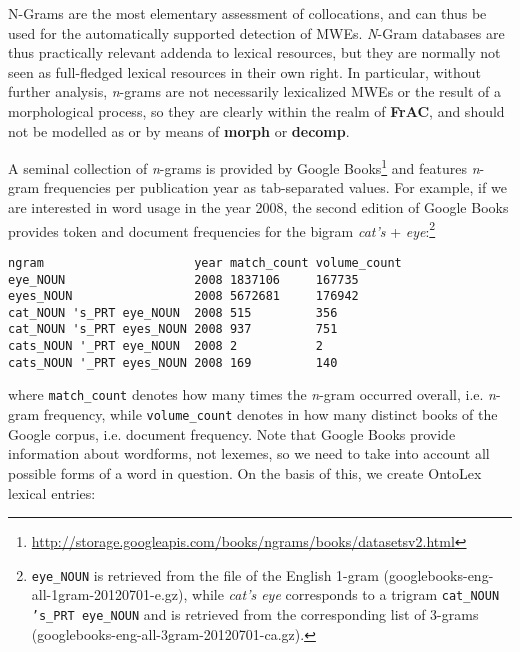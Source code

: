 \documentclass[output=paper,colorlinks,citecolor=brown]{langscibook}
\begin{document}


N-Grams are the most elementary assessment of collocations, and can thus be used for the automatically supported detection of MWEs. \textit{N}-Gram databases are thus practically relevant addenda to lexical resources, but they are normally not seen as full-fledged lexical resources in their own right. In particular, without further analysis, \textit{n}-grams  are not necessarily lexicalized MWEs or the result of a morphological process, so they are clearly within the realm of \textbf{FrAC}, and should not be modelled as  or by means of \textbf{morph} or \textbf{decomp}.

A seminal collection of \textit{n}-grams is provided by
Google Books\footnote{\url{http://storage.googleapis.com/books/ngrams/books/datasetsv2.html}} and features \textit{n}-gram frequencies per publication year as
tab-separated values. For example, if we are interested in word usage in the year 2008, the second edition of Google Books provides token and document frequencies for the bigram \emph{cat's} + \emph{eye}:\footnote{%
\texttt{eye\_NOUN} is retrieved from the file of the English 1-gram (googlebooks-eng-all-1gram-20120701-e.gz), while \textit{cat's eye} corresponds to a trigram \texttt{cat\_NOUN 's\_PRT eye\_NOUN} and is retrieved from the corresponding list of 3-grams (googlebooks-eng-all-3gram-20120701-ca.gz).
}


{\listingsize
\begin{verbatim}
ngram                     year match_count volume_count
eye_NOUN                  2008 1837106     167735
eyes_NOUN                 2008 5672681     176942
cat_NOUN 's_PRT eye_NOUN  2008 515         356
cat_NOUN 's_PRT eyes_NOUN 2008 937         751
cats_NOUN '_PRT eye_NOUN  2008 2           2
cats_NOUN '_PRT eyes_NOUN 2008 169         140
\end{verbatim}
}

\noindent where \texttt{match\_count} denotes how many times the \textit{n}-gram occurred overall, i.e. \textit{n}-gram frequency, while
\texttt{volume\_count} denotes in how many distinct books of the Google corpus, i.e. document frequency.
\noindent
Note that Google Books provide information about wordforms, not lexemes, so we need to take into account all possible forms of a word in question. On the basis of this, we create OntoLex lexical entries:
\end{document}
